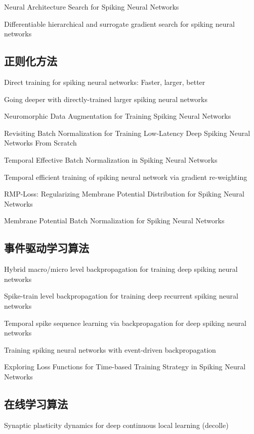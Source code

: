 \documentclass{SCIS2020cn}
\begin{document}
Neural Architecture Search for Spiking Neural Networks

Differentiable hierarchical and surrogate gradient
search for spiking neural networks

\subsection{正则化方法}%

Direct training for spiking neural networks: Faster, larger, better

Going deeper with directly-trained larger spiking neural networks

Neuromorphic Data Augmentation for Training Spiking Neural Networks

Revisiting Batch Normalization for Training Low-Latency Deep Spiking Neural Networks From Scratch

Temporal Effective Batch Normalization in Spiking Neural Networks

Temporal efficient training of spiking neural network via gradient re-weighting

RMP-Loss: Regularizing Membrane Potential Distribution for Spiking Neural Networks

Membrane Potential Batch Normalization for Spiking Neural Networks


\subsection{事件驱动学习算法}%

Hybrid macro/micro level backpropagation for training deep spiking neural networks

Spike-train level backpropagation for training deep recurrent spiking neural networks

Temporal spike sequence learning via backpropagation for deep spiking neural networks

Training spiking neural networks with event-driven backpropagation

Exploring Loss Functions for Time-based Training Strategy in Spiking Neural Networks

\subsection{在线学习算法}%

Synaptic plasticity dynamics for deep continuous local learning (decolle)
\end{document}

